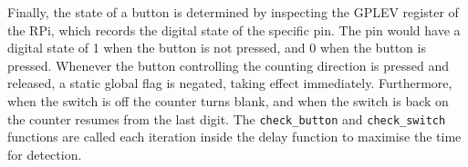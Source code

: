 \documentclass[9pt,a4paper]{article}
\begin{document}
Finally, the state of a button is determined by inspecting the GPLEV register of the RPi, which records the digital state of the specific pin.
The pin would have a digital state of 1 when the button is not pressed, and 0 when the button is pressed.
Whenever the button controlling the counting direction is pressed and released, a static global flag is negated, taking effect immediately.
Furthermore, when the switch is off the counter turns blank, and when the switch is back on the counter resumes from the last digit.
The \verb|check_button| and \verb|check_switch| functions are called each iteration inside the delay function to maximise the time for detection.

\noindent
\begin{minipage}[t]{0.4\textwidth}
\centering
{}
\end{minipage}
\hfill
\end{document}
